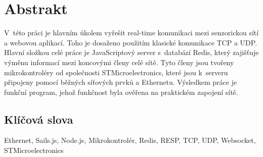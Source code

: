 \chapter*{Abstrakt}
V~této práci je hlavním úkolem vyřešit real-time komunikaci mezi senzorickou sítí a webovou aplikací. Toho je dosaženo použitím klasické komunikace TCP a UDP. Hlavní složkou celé práce je JavaScriptový server s~databází Redis, který zajišťuje výměnu informací mezi koncovými členy celé sítě. Tyto členy jsou tvořeny mikrokontroléry od společnosti STMicroelectronics, které jsou k~serveru připojeny pomocí běžných síťových prvků a Ethernetu. Výsledkem práce je funkční program, jehož funkčnost byla ověřena na praktickém zapojení sítě.

\vfill

\section*{Klíčová slova}
Ethernet, Sails.js, Node.js, Mikrokontrolér, Redis, RESP, TCP, UDP, Websocket, STMicroelectronics